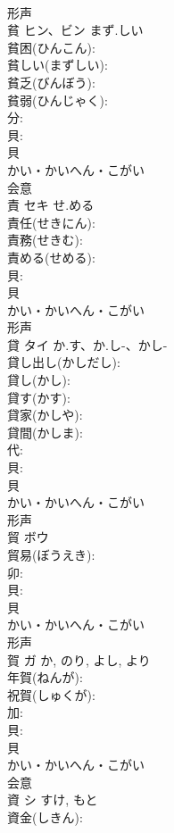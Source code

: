\documentclass[8pt]{extreport}
\begin{document}
\begin{CJK}{UTF8}{min}
\\	形声 
\\	貧	ヒン、ビン	まず.しい		
\\	貧困(ひんこん): 
\\	貧しい(まずしい): 
\\	貧乏(びんぼう): 
\\	貧弱(ひんじゃく): 
\\	分: 
\\	貝: 
\\	貝	
\\	かい・かいへん・こがい	
\\	会意 
\\	責	セキ	せ.める		
\\	責任(せきにん): 
\\	責務(せきむ): 
\\	責める(せめる): 
\\	貝: 
\\	貝	
\\	かい・かいへん・こがい	
\\	形声 
\\	貸	タイ	か.す、か.し-、かし-		
\\	貸し出し(かしだし): 
\\	貸し(かし): 
\\	貸す(かす): 
\\	貸家(かしや): 
\\	貸間(かしま): 
\\	代: 
\\	貝: 
\\	貝	
\\	かい・かいへん・こがい	
\\	形声 
\\	貿	ボウ			
\\	貿易(ぼうえき): 
\\	卯: 
\\	貝: 
\\	貝	
\\	かい・かいへん・こがい	
\\	形声 
\\	賀	ガ		か, のり, よし, より	
\\	年賀(ねんが): 
\\	祝賀(しゅくが): 
\\	加: 
\\	貝: 
\\	貝	
\\	かい・かいへん・こがい	
\\	会意 
\\	資	シ		すけ, もと	
\\	資金(しきん): 

\end{CJK}
\end{document}
